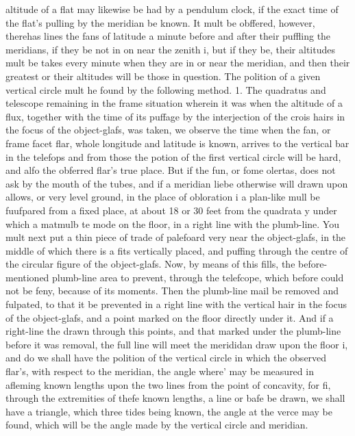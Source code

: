 \documentclass{article}
\begin{document}
altitude of a flat may likewise be had by a pendulum clock, if the exact time of the flat’s pulling by the meridian be known. It mult be obffered, however, therehas lines the fans of latitude a minute before and after their puffling the meridians, if they be not in on near the zenith i, but if they be, their altitudes mult be takes every minute when they are in or near the meridian, and then their greatest or their altitudes will be those in question. The polition of a given vertical circle mult he found by the following method. 1. The quadratus and telescope remaining in the frame situation wherein it was when the altitude of a flux, together with the time of its puffage by the interjection of the crois hairs in the focus of the object-glafs, was taken, we observe the time when the fan, or frame facet flar, whole longitude and latitude is known, arrives to the vertical bar in the telefops and from those the potion of the first vertical circle will be hard, and alfo the obferred flar's true place. But if the fun, or fome olertas, does not ask by the mouth of the tubes, and if a meridian liebe otherwise will drawn upon allows, or very level ground, in the place of obloration i a plan-like mull be fuufpared from a fixed place, at about 18 or 30 feet from the quadrata y under which a matmulb te mode on the floor, in a right line with the plumb-line. You mult next put a thin piece of trade of palefoard very near the object-glafs, in the middle of which there is a fits vertically placed, and puffing through the centre of the circular figure of the object-glafs. Now, by means of this fills, the before-mentioned plumb-line area to prevent, through the telefcope, which before could not be feny, because of its moments. Then the plumb-line mail be removed and fulpated, to that it be prevented in a right line with the vertical hair in the focus of the object-glafs, and a point marked on the floor directly under it. And if a right-line the drawn through this points, and that marked under the plumb-line before it was removal, the full line will meet the merididan draw upon the floor i, and do we shall have the polition of the vertical circle in which the observed flar's, with respect to the meridian, the angle where' may be measured in afleming known lengths upon the two lines from the point of concavity, for fi, through the extremities of thefe known lengths, a line or bafe be drawn, we shall have a triangle, which three tides being known, the angle at the verce may be found, which will be the angle made by the vertical circle and meridian.
\end{document}
